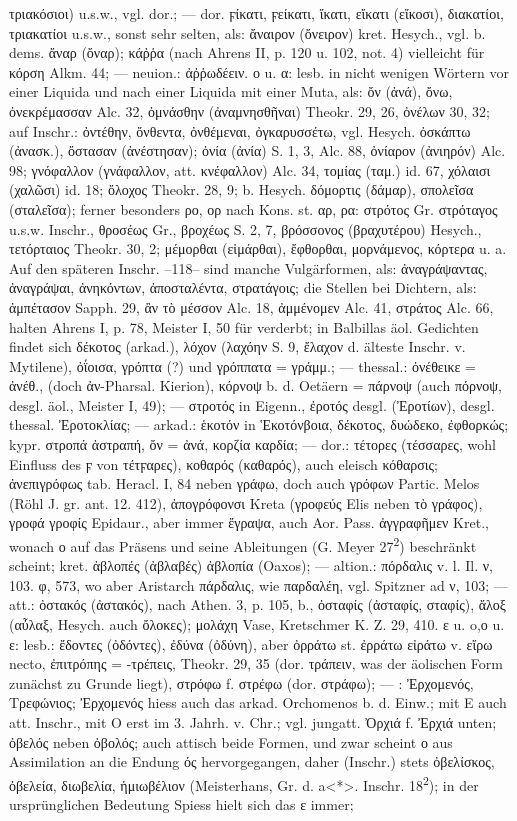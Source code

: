 τριακόσιοι) u.s.w., vgl.  dor.; — dor. ϝίκατι, ϝείκατι, ἴκατι, εἴκατι (εἴκοσι), διακατίοι, τριακατίοι u.s.w., sonst sehr selten, als: ἄναιρον (ὄνειρον) kret. Hesych., vgl. b. dems. ἄναρ (ὄναρ); κάῤῥα (nach Ahrens II, p. 120 u. 102, not. 4) vielleicht für κόρση Alkm. 44; — neuion.: ἀῤῥωδέειν. ο u. α: lesb. in nicht wenigen Wörtern vor einer Liquida und nach einer Liquida mit einer Muta, als: ὄν (ἀνά), ὄνω, ὀνεκρέμασσαν Alc. 32, ὀμνάσθην (ἀναμνησθῆναι) Theokr. 29, 26, ὀνέλων 30, 32; auf Inschr.: ὀντέθην, ὄνθεντα, ὀνθέμεναι, ὀγκαρυσσέτω, vgl. Hesych. ὀσκάπτω (ἀνασκ.), ὄστασαν (ἀνέστησαν); ὀνία (ἀνία) S. 1, 3, Alc. 88, ὀνίαρον (ἀνιηρόν) Alc. 98; γνόφαλλον (γνάφαλλον, att. κνέφαλλον) Alc. 34, τομίας (ταμ.) id. 67, χόλαισι (χαλῶσι) id. 18; ὄλοχος Theokr. 28, 9; b. Hesych. δόμορτις (δάμαρ), σπολεῖσα (σταλεῖσα); ferner besonders ρο, ορ nach Kons. st. αρ, ρα: στρότος Gr. στρόταγος u.s.w. Inschr., θροσέως Gr., βροχέως S. 2, 7, βρόσσονος (βραχυτέρου) Hesych., τετόρταιος Theokr. 30, 2; μέμορθαι (εἱμάρθαι), ἔφθορθαι, μορνάμενος, κόρτερα u. a. Auf den späteren Inschr. --118-- sind manche Vulgärformen, als: ἀναγράψαντας, ἀναγράψαι, ἀνηκόντων, ἀποσταλέντα, στρατάγοις; die Stellen bei Dichtern, als: ἀμπέτασον Sapph. 29, ἂν τὸ μέσσον Alc. 18, ἀμμένομεν Alc. 41, στράτος Alc. 66, halten Ahrens I, p. 78, Meister I, 50 für verderbt; in Balbillas äol. Gedichten findet sich δέκοτος (arkad.), λόχον (λαχόην S. 9, ἔλαχον d. älteste Inschr. v. Mytilene), ὀΐοισα, γρόπτα (?) und γρόππατα = γράμμ.; — thessal.: ὀνέθεικε = ἀνέθ., (doch ἀν-Pharsal. Kierion), κόρνοψ b. d. Oetäern = πάρνοψ (auch  πόρνοψ, desgl. äol., Meister I, 49); —  στροτός in Eigenn., ἐροτός desgl. (Ἐροτίων), desgl. thessal. Ἐροτοκλίας; — arkad.: ἑκοτόν in Ἑκοτόνβοια, δέκοτος, δυώδεκο, ἐφθορκώς; kypr. στροπά ἀστραπή, ὄν = ἀνά, κορζία καρδία; — dor.: τέτορες (τέσσαρες, wohl Einfluss des ϝ von τέτϝαρες), κοθαρός (καθαρός), auch eleisch κόθαρσις; ἀνεπιγρόφως tab. Heracl. I, 84 neben γράφω, doch auch γρόφων Partic. Melos (Röhl J. gr. ant. 12. 412), ἀπογρόφονσι Kreta (γροφεύς Elis neben τὸ γράφος), γροφά γροφίς Epidaur., aber immer ἔγραψα, auch Aor. Pass. ἀγγραφῆμεν Kret., wonach ο auf das Präsens und seine Ableitungen (G. Meyer 27\textsuperscript{2}) beschränkt scheint; kret. ἀβλοπές (ἀβλαβές) ἀβλοπία (Oaxos); — altion.: πόρδαλις v. l. Il. ν, 103. φ, 573, wo aber Aristarch πάρδαλις, wie παρδαλέη, vgl. Spitzner ad ν, 103; — att.: ὀστακός (ἀστακός), nach Athen. 3, p. 105, b., ὀσταφίς (ἀσταφίς, σταφίς), ἄλοξ (αὖλαξ, Hesych. auch ὄλοκες); μολάχη Vase, Kretschmer K. Z. 29, 410. ε u. o,ο u. ε: lesb.: ἔδοντες (ὀδόντες), ἐδύνα (ὀδύνη), aber ὀρράτω st. ἐρράτω εἰράτω v. εἴρω necto, ἐπιτρόπης = -τρέπεις, Theokr. 29, 35 (dor. τράπειν, was der äolischen Form zunächst zu Grunde liegt), στρόφω f. στρέφω (dor. στράφω); — : Ἐρχομενός, Τρεφώνιος; Ἐρχομενός hiess auch das arkad. Orchomenos b. d. Einw.; mit Ε auch att. Inschr., mit Ο erst im 3. Jahrh. v. Chr.; vgl. jungatt. Ὀρχιά f. Ἐρχιά unten; ὀβελός neben ὀβολός; auch attisch beide Formen, und zwar scheint ο aus Assimilation an die Endung ός hervorgegangen, daher (Inschr.) stets ὀβελίσκος, ὀβελεία, διωβελία, ἡμιωβέλιον (Meisterhans, Gr. d. a<*>. Inschr. 18\textsuperscript{2}); in der ursprünglichen Bedeutung Spiess hielt sich das ε immer; 